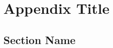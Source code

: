 \chapter{Appendix Title}\label{appendix}
\fixchapterheading
\section*{Section Name}\label{Section Name.section}
\setcounter{thrm}{0} %
%
%

